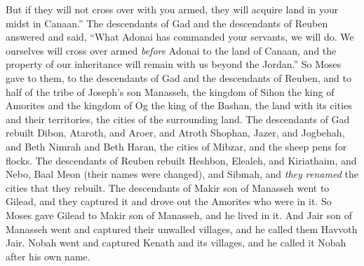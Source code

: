 \begin{biblechapter}
\verse But if they will not cross over with you armed, they will acquire land in your midst in Canaan.”
\verse The descendants of Gad and the descendants of Reuben answered and said, “What Adonai has commanded your servants, we will do.
\verse We ourselves will cross over armed \textit{before} Adonai to the land of Canaan, and the property of our inheritance will remain with us beyond the Jordan.”
\verse So Moses gave to them, to the descendants of Gad and the descendants of Reuben, and to half of the tribe of Joseph’s son Manasseh, the kingdom of Sihon the king of Amorites and the kingdom of Og the king of the Bashan, the land with its cities and their territories, the cities of the surrounding land.
\verse The descendants of Gad rebuilt Dibon, Ataroth, and Aroer,
\verse and Atroth Shophan, Jazer, and Jogbehah,
\verse and Beth Nimrah and Beth Haran, the cities of Mibzar, and the sheep pens for flocks.
\verse The descendants of Reuben rebuilt Heshbon, Elealeh, and Kiriathaim,
\verse and Nebo, Baal Meon (their names were changed), and Sibmah, and \textit{they renamed} the cities that they rebuilt.
\verse The descendants of Makir son of Manasseh went to Gilead, and they captured it and drove out the Amorites who were in it.
\verse So Moses gave Gilead to Makir son of Manasseh, and he lived in it.
\verse And Jair son of Manasseh went and captured their unwalled villages, and he called them Havvoth Jair.
\verse Nobah went and captured Kenath and its villages, and he called it Nobah after his own name.
\end{biblechapter}

